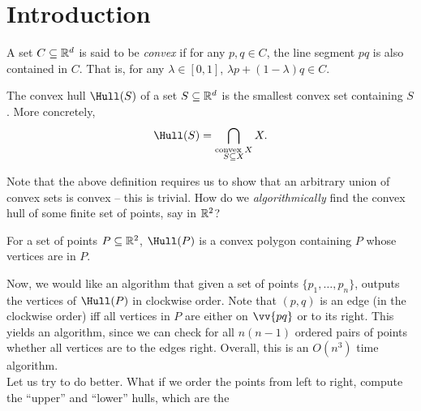 \section{Introduction}

\begin{fdef}
	A set $C \subseteq \mathbb{R}^d$ is said to be \emph{convex} if for any $p,q \in C$, the line segment $pq$ is also contained in $C$. That is, for any $\lambda \in [0,1]$, $\lambda p + (1-\lambda) q \in C$.\\
\end{fdef}

\begin{fdef}
	The convex hull $\Hull(S)$ of a set $S \subseteq \mathbb{R}^d$ is the smallest convex set containing $S$. More concretely,
	\[ \Hull(S) = \bigcap_{\substack{\text{convex $X$} \\ S \subseteq X}} X. \]
\end{fdef}

Note that the above definition requires us to show that an arbitrary union of convex sets is convex -- this is trivial. How do we \emph{algorithmically} find the convex hull of some finite set of points, say in $\mathbb{R}^2$?

\begin{flem}
	For a set of points $P \subseteq \mathbb{R}^2$, $\Hull(P)$ is a convex polygon containing $P$ whose vertices are in $P$.
\end{flem}

Now, we would like an algorithm that given a set of points $\{p_1,\ldots,p_n\}$, outputs the vertices of $\Hull(P)$ in clockwise order. Note that $(p,q)$ is an edge (in the clockwise order) iff all vertices in $P$ are either on $\vv{pq}$ or to its right. This yields an algorithm, since we can check for all $n(n-1)$ ordered pairs of points whether all vertices are to the edges right. Overall, this is an $O(n^3)$ time algorithm.\\

Let us try to do better. What if we order the points from left to right, compute the ``upper'' and ``lower'' hulls, which are the 